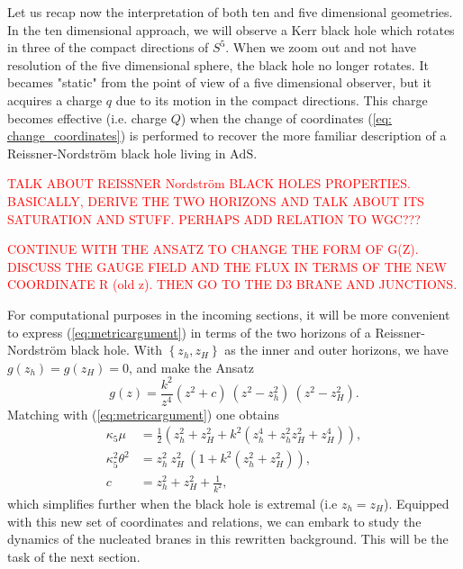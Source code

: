\documentclass[12pt, a4paper]{article} %
\begin{document}
Let us recap now the interpretation of both ten and five dimensional geometries. In the ten dimensional approach, we will observe a Kerr black hole which rotates in three of the compact directions of $S^{5}$. When we zoom out and not have resolution of the five dimensional sphere, the black hole no longer rotates. It becames "static" from the point of view of a five dimensional observer, but it acquires a charge $q$ due to its motion in the compact directions. This charge becomes effective (i.e. charge $Q$) when the change of coordinates (\ref{eq: change_coordinates}) is performed to recover the more familiar description of a Reissner-Nordström black hole living in $\text{AdS}$.

\textcolor{red}{TALK ABOUT REISSNER Nordström BLACK HOLES PROPERTIES. BASICALLY, DERIVE THE TWO HORIZONS AND TALK ABOUT ITS SATURATION AND STUFF. PERHAPS ADD RELATION TO WGC???}

\textcolor{red}{CONTINUE WITH THE ANSATZ TO CHANGE THE FORM OF G(Z). DISCUSS THE GAUGE FIELD AND THE FLUX IN TERMS OF THE NEW COORDINATE R (old z). THEN GO TO THE D3 BRANE AND JUNCTIONS.}

For computational purposes in the incoming sections, it will be more convenient to express (\ref{eq:metricargument}) in terms of the two horizons of a Reissner-Nordström black hole. With $\left\{z_{h}, z_{H}\right\}$ as the inner and outer horizons, we have $g(z_h)=g(z_H)=0$, and make the Ansatz
\begin{equation}
    g(z) = \frac{k^{2}}{z^{4}}\left(z^{2} + c\right)\:\left(z^{2} -z_{h}^{2}\right)\:\left(z^{2} - z_{H}^{2}\right).
\end{equation}
Matching with (\ref{eq:metricargument}) one obtains
\begin{equation}\label{eq:muthetatohorizons}
    \begin{split}
        \kappa_5 \mu &= \tfrac{1}{2}\left(z_h^{2} + z_H^{2} +k^2\left( z_h^4  + z_h^{2} z_H^{2}  + z_H^4 \right)\right),  \\
        \kappa_5^2 \theta^2 &=z_{h}^{2}\:z_{H}^{2} \:\left(1 + k^{2}\left(z^{2}_{h}+ z_{H}^{2}\right)\right),\\
        c &= z_{h}^{2} + z_{H}^{2} + \tfrac{1}{k^{2}},
    \end{split}
\end{equation}
which simplifies further when the black hole is extremal (i.e $z_{h} = z_{H}$). Equipped with this new set of coordinates and relations, we can embark to study the dynamics of the nucleated branes in this rewritten background. This will be the task of the next section.
\end{document}
